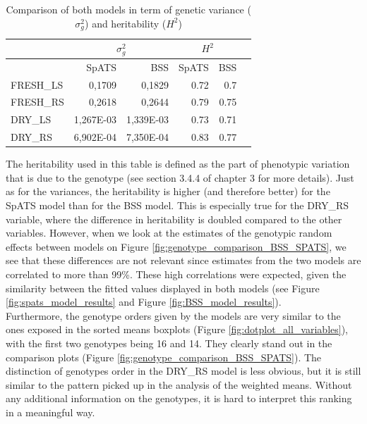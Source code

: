 \begin{table}[htbp]
  \centering
  \caption[Comparison of both models in term of genetic variance and heritability]{Comparison of both models in term of genetic variance ($\sigma_{g}^2$) and heritability ($H^2$) }
    \begin{tabular}{lrrrrr}
 \toprule 
  & \multicolumn{2}{c}{$\sigma_{g}^2$} & \multicolumn{2}{c}{$H^2$} \\ 
  \midrule
  & SpATS & BSS & SpATS & BSS \\
  \midrule
 \hline 
 FRESH\_LS & 0,1709 & 0,1829 & 0.72 & 0.7 \\
 FRESH\_RS & 0,2618 & 0,2644 & 0.79 & 0.75 \\ 
 DRY\_LS & 1,267E-03 & 1,339E-03 & 0.73 & 0.71 \\ 
 DRY\_RS & 6,902E-04 & 7,350E-04 & 0.83 & 0.77 \\  
 \bottomrule 
    \end{tabular}%
\label{tab:geno_var_heritability}
\end{table}%
 
The heritability used in this table is defined as the part of phenotypic variation that is due to the genotype (see section 3.4.4 of chapter 3 for more details). Just as for the variances, the heritability is higher (and therefore better) for the SpATS model than for the BSS model. This is especially true for the DRY\_RS variable, where the difference in heritability is doubled compared to the other variables. However, when we look at the estimates of the genotypic random effects between models on Figure \ref{fig:genotype_comparison_BSS_SPATS}, we see that these differences are not relevant since estimates from the two models are correlated to more than 99\%. These high correlations were expected, given the similarity between the fitted values displayed in both models (see Figure \ref{fig:spats_model_results} and Figure \ref{fig:BSS_model_results}).\\

Furthermore, the genotype orders given by the models are very similar to the ones exposed in the sorted means boxplots (Figure \ref{fig:dotplot_all_variables}), with the first two genotypes being 16 and 14. They clearly stand out in the comparison plots (Figure \ref{fig:genotype_comparison_BSS_SPATS}). The distinction of genotypes order in the DRY\_RS model is less obvious, but it is still similar to the pattern picked up in the analysis of the weighted means. Without any additional information on the genotypes, it is hard to interpret this ranking in a meaningful way.\\
 
